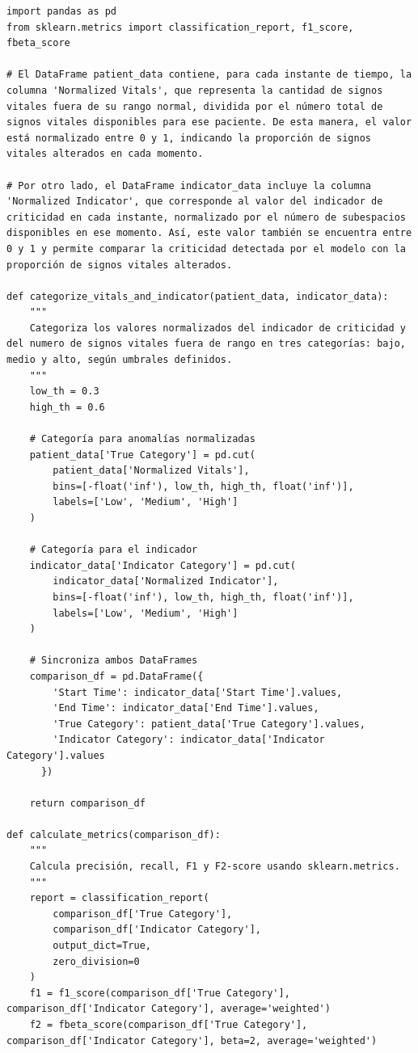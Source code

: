 \begin{verbatim}
import pandas as pd
from sklearn.metrics import classification_report, f1_score, fbeta_score

# El DataFrame patient_data contiene, para cada instante de tiempo, la columna 'Normalized Vitals', que representa la cantidad de signos vitales fuera de su rango normal, dividida por el número total de signos vitales disponibles para ese paciente. De esta manera, el valor está normalizado entre 0 y 1, indicando la proporción de signos vitales alterados en cada momento.

# Por otro lado, el DataFrame indicator_data incluye la columna 'Normalized Indicator', que corresponde al valor del indicador de criticidad en cada instante, normalizado por el número de subespacios disponibles en ese momento. Así, este valor también se encuentra entre 0 y 1 y permite comparar la criticidad detectada por el modelo con la proporción de signos vitales alterados.

def categorize_vitals_and_indicator(patient_data, indicator_data):
    """
    Categoriza los valores normalizados del indicador de criticidad y del numero de signos vitales fuera de rango en tres categorías: bajo, medio y alto, según umbrales definidos.
    """
    low_th = 0.3
    high_th = 0.6

    # Categoría para anomalías normalizadas
    patient_data['True Category'] = pd.cut(
        patient_data['Normalized Vitals'],
        bins=[-float('inf'), low_th, high_th, float('inf')],
        labels=['Low', 'Medium', 'High']
    )

    # Categoría para el indicador
    indicator_data['Indicator Category'] = pd.cut(
        indicator_data['Normalized Indicator'],
        bins=[-float('inf'), low_th, high_th, float('inf')],
        labels=['Low', 'Medium', 'High']
    )

    # Sincroniza ambos DataFrames
    comparison_df = pd.DataFrame({
        'Start Time': indicator_data['Start Time'].values,
        'End Time': indicator_data['End Time'].values,
        'True Category': patient_data['True Category'].values,
        'Indicator Category': indicator_data['Indicator Category'].values
      })

    return comparison_df

def calculate_metrics(comparison_df):
    """
    Calcula precisión, recall, F1 y F2-score usando sklearn.metrics.
    """
    report = classification_report(
        comparison_df['True Category'],
        comparison_df['Indicator Category'],
        output_dict=True,
        zero_division=0
    )
    f1 = f1_score(comparison_df['True Category'], comparison_df['Indicator Category'], average='weighted')
    f2 = fbeta_score(comparison_df['True Category'], comparison_df['Indicator Category'], beta=2, average='weighted')


\end{verbatim}
